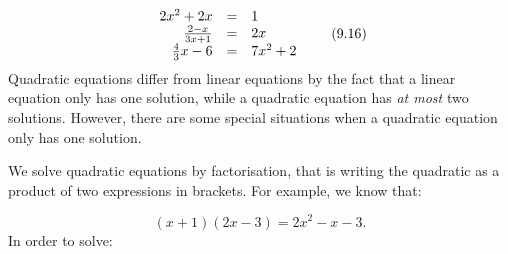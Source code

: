     \begin{equation}
    \begin{array}{ccc}\hfill 2{x}^{2}+2x& =& 1\hfill \\ \hfill \frac{2-x}{3x+1}& =& 2x\hfill \\ \hfill \frac{4}{3}x-6& =& 7{x}^{2}+2\hfill \end{array}\tag{9.16}
      \end{equation}
      \label{m39247*id149478}Quadratic equations differ from linear equations by the fact that a linear
equation only has one solution, while a quadratic equation has \textsl{at most}
two solutions. However, there are some special situations when a quadratic equation only
has one solution.\par 
      \label{m39247*id149489}We solve quadratic equations by factorisation, that is writing the quadratic as
a product of two expressions in brackets. For example, we know that:\par 
      \label{m39247*id149493}\nopagebreak\noindent{}
        
    \begin{equation}
    \left(x+1\right)\left(2x-3\right)=2{x}^{2}-x-3.\tag{9.17}
      \end{equation}
      \label{m39247*id149552}In order to solve:\par 
      \label{m39247*id149557}\nopagebreak\noindent{}
        
